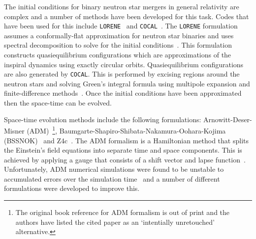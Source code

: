 \documentclass[../Thesis.tex]{subfiles}
\begin{document}
    The initial conditions for binary neutron star mergers in general relativity are complex and a number of methods have been developed for this task.
    Codes that have been used for this include \texttt{LORENE}~\cite{Gourgoulhon2001} and \texttt{COCAL}~\cite{Tsokaros2015}.
    The \texttt{LORENE} formulation assumes a conformally-flat approximation for  neutron star binaries and uses spectral decomposition to solve for the initial conditions~\cite{Gourgoulhon2001}.
    This formulation constructs quasiequilibrium configurations which are approximations of the inspiral dynamics using exactly circular orbits.
    Quasiequilibrium configurations are also generated by \texttt{COCAL}.
    This is performed by excising regions around the neutron stars and solving Green's integral formula using multipole expansion and finite-difference methods~\cite{Uryu2012,Tsokaros2015}.
    Once the initial conditions have been approximated then the space-time can be evolved.

    Space-time evolution methods include the following formulations: Arnowitt-Deser-Misner (ADM)~\cite{Arnowitt2008}\footnote{The original book reference for ADM formalism is out of print and the authors have listed the cited paper as an `intentially unretouched' alternative.},  Baumgarte-Shapiro-Shibata-Nakamura-Oohara-Kojima (BSSNOK)~\cite{Nakamura1987,Shibata1995,Baumgarte1999,Alcubierre2000} and Z4c~\cite{Bona2003,Bona2004,Gundlach2005,Bernuzzi2010,Hilditch2013}. 
    The ADM formalism is a Hamiltonian method that splits the Einstein's field equations into separate time and space components.
    This is achieved by applying a gauge that consists of a shift vector and lapse function~\cite{Arnowitt2008}.
    Unfortunately, ADM numerical simulations were found to be unstable to accumulated errors over the simulation time~\cite{Brandt2000,Kidder2001,Alcubierre2001a} and a number of different formulations were developed to improve this. \par
    
\end{document}
